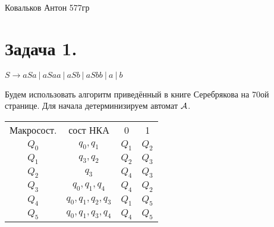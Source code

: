 \documentclass[12pt]{article}
\theoremstyle{definition}
\theoremstyle{definition}
\let\ra\rightarrow
\def\A{{\cal A}}
\begin{document}
\begin{center} {\LARGE Ковальков Антон 577гр} \end{center}
\section*{Задача  1.}

$S \ra aSa\ |\ aSaa\ |\ aSb\ |\ aSbb\ |\ a\ |\ b$

Будем использовать алгоритм приведённый в книге Серебрякова на 70ой странице.
Для начала детерминизируем автомат $\A$.
\begin{center} 
\begin{tabular}{cccc}
Макросост. & сост НКА & 0 & 1 \\
$Q_0$ & $q_0, q_1$ & $Q_1$ & $Q_2$ \\
$Q_1$ & $q_3, q_2$ & $Q_2$ & $Q_3$ \\
$Q_2$ & $q_3$ & $Q_4$ & $Q_3$ \\
$Q_3$ & $q_0, q_1, q_4$ & $Q_4$ & $Q_2$ \\
$Q_4$ & $q_0, q_1, q_2, q_3$ & $Q_1$ & $Q_5$ \\
$Q_5$ & $q_0, q_1, q_3, q_4$ & $Q_4$ & $Q_5$ \\
\end{tabular}
\end{center} 
\end{document}
